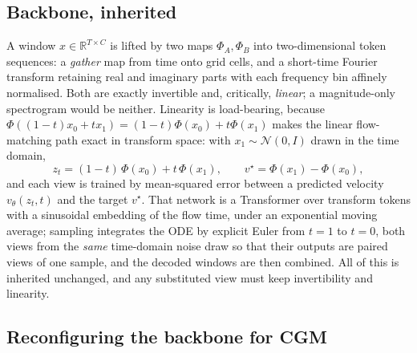\documentclass[journal]{IEEEtran}
\begin{document}
\subsection{Backbone, inherited}

A window $x\in\mathbb{R}^{T\times C}$ is lifted by two maps $\Phi_A,\Phi_B$ into
two-dimensional token sequences: a \emph{gather} map from time onto grid cells, and a
short-time Fourier transform retaining real and imaginary parts with each frequency bin
affinely normalised. Both are exactly invertible and, critically, \emph{linear}; a
magnitude-only spectrogram would be neither. Linearity is load-bearing, because
$\Phi((1-t)x_0+tx_1)=(1-t)\Phi(x_0)+t\Phi(x_1)$ makes the linear flow-matching path exact in
transform space: with $x_1\sim\mathcal{N}(0,I)$ drawn in the time domain,
\begin{equation}
z_t = (1-t)\,\Phi(x_0)+t\,\Phi(x_1), \qquad v^{\star}=\Phi(x_1)-\Phi(x_0),
\label{eq:fmpath}
\end{equation}
and each view is trained by mean-squared error between a predicted velocity
$v_\theta(z_t,t)$ and the target $v^{\star}$. That network is a Transformer over transform
tokens with a sinusoidal embedding of the flow time, under an exponential moving average;
sampling integrates the ODE by explicit Euler from $t=1$ to $t=0$, both views from the
\emph{same} time-domain noise draw so that their outputs are paired views of one sample, and
the decoded windows are then combined. All of this is inherited unchanged, and any
substituted view must keep invertibility and linearity.

\subsection{Reconfiguring the backbone for CGM}
\label{ssec:cgm}
\end{document}
